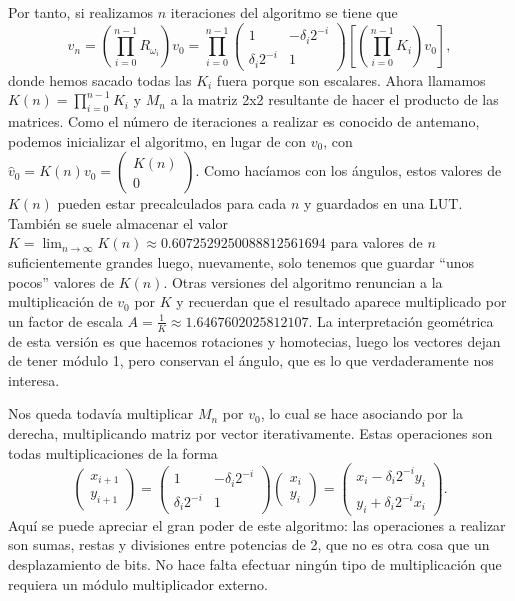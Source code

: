 \documentclass[12pt, a4paper]{article}
\begin{document}
 Por tanto, si realizamos $n$ iteraciones del algoritmo se tiene que 
 \[
 v_n=\left(\prod_{i=0}^{n-1}R_{\omega_i} \right) v_{0}=\prod_{i=0}^{n-1}\begin{pmatrix*}
  1 & -\delta_i2^{-i}\\
  \delta_i2^{-i} & 1 
 \end{pmatrix*}\left[\left(\prod_{i=0}^{n-1}K_i\right) v_{0}\right],
 \]
 donde hemos sacado todas las $K_i$ fuera porque son escalares. Ahora llamamos $K(n)=\prod_{i=0}^{n-1}K_i$ y $M_n$ a la matriz 2x2 resultante de hacer el producto de las matrices. Como el número de iteraciones a realizar es conocido de antemano, podemos inicializar el algoritmo, en lugar de con $v_0$, con $\hat{v}_0 = K(n)v_0=\begin{pmatrix*}
  K(n)\\
  0
 \end{pmatrix*}$. Como hacíamos con los ángulos, estos valores de $K(n)$ pueden estar precalculados para cada $n$ y guardados en una LUT. También se suele almacenar el valor $K=\lim_{n \to \infty}K(n)\approx0.6072529250088812561694$ para valores de $n$ suficientemente grandes luego, nuevamente, solo tenemos que guardar ``unos pocos'' valores de $K(n)$. Otras versiones del algoritmo renuncian a la multiplicación de $v_0$ por $K$ y recuerdan que el resultado aparece multiplicado por un factor de escala $A=\frac{1}{K}\approx 1.6467602025812107$. La interpretación geométrica de esta versión es que hacemos rotaciones y homotecias, luego los vectores dejan de tener módulo 1, pero conservan el ángulo, que es lo que verdaderamente nos interesa.
 
 Nos queda todavía multiplicar $M_n$ por $v_0$, lo cual se hace asociando por la derecha, multiplicando matriz por vector iterativamente. Estas operaciones son todas multiplicaciones de la forma 
 \[
 \begin{pmatrix*}
  x_{i+1}\\
  y_{i+1}
 \end{pmatrix*}=
 \begin{pmatrix*}
  1 & -\delta_i2^{-i}\\
  \delta_i2^{-i} & 1 
 \end{pmatrix*}
 \begin{pmatrix*}
  x_i\\
  y_i
 \end{pmatrix*}
 =\begin{pmatrix*}
  x_i -\delta_i2^{-i}y_i\\
  y_i +\delta_i2^{-i}x_i
 \end{pmatrix*}.
 \] Aquí se puede apreciar el gran poder de este algoritmo: las operaciones a realizar son sumas, restas y divisiones entre potencias de 2, que no es otra cosa que un desplazamiento de bits. No hace falta efectuar ningún tipo de multiplicación que requiera un módulo multiplicador externo.
 
\end{document}
